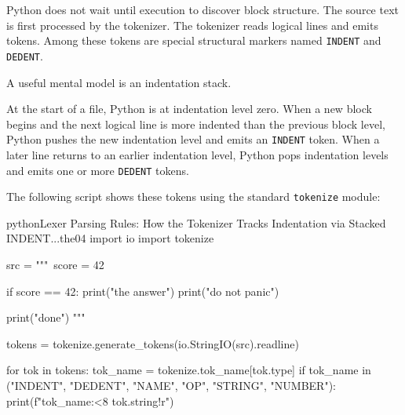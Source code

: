 Python does not wait until execution to discover block structure. The source text is first processed by the tokenizer. The tokenizer reads logical lines and emits tokens. Among these tokens are special structural markers named \texttt{INDENT} and \texttt{DEDENT}.

A useful mental model is an indentation stack.

At the start of a file, Python is at indentation level zero. When a new block begins and the next logical line is more indented than the previous block level, Python pushes the new indentation level and emits an \texttt{INDENT} token. When a later line returns to an earlier indentation level, Python pops indentation levels and emits one or more \texttt{DEDENT} tokens.

The following script shows these tokens using the standard \texttt{tokenize} module:

\begin{codebox}[]{python}{Lexer Parsing Rules: How the Tokenizer Tracks Indentation via Stacked INDENT...}{the04}
import io
import tokenize

src = """\
score = 42

if score == 42:
    print("the answer")
    print("do not panic")

print("done")
"""

tokens = tokenize.generate_tokens(io.StringIO(src).readline)

for tok in tokens:
    tok_name = tokenize.tok_name[tok.type]
    if tok_name in ("INDENT", "DEDENT", "NAME", "OP", "STRING", "NUMBER"):
        print(f"{tok_name:<8} {tok.string!r}")
\end{codebox}


